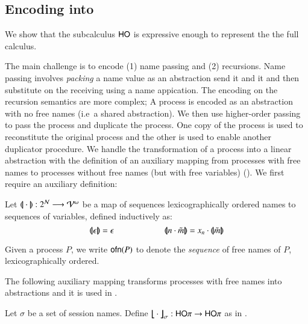 
\subsection{Encoding \HOp into \HO}
\label{subsec:HOp_to_HO}

We show that the subcalculus $\mathsf{HO}$ is expressive enough to
represent the the full \HOp calculus.

The main challenge is to encode (1) name passing 
and (2) recursions.
Name passing involves {\em packing} a name 
value as an abstraction send it and it and then
substitute on the receiving using a name appication.
The encoding on the recursion semantics are more complex;
A process is encoded as an abstraction with no free names
(i.e~a shared abstraction). We then use higher-order
passing to pass the process and duplicate the process.
One copy of the process is used to reconstitute the
original process and the other is used to enable another
duplicator procedure.
We handle the transformation of a process into a linear abstraction
with the definition of an
auxiliary mapping
from processes with free names to processes without free names
(but with free variables) (). 
We first require an auxiliary definition:
%
\begin{definition}\myrm 
	Let $(\!|\!|\cdot|\!|\!): 2^{\mathcal{N}} \longrightarrow \mathcal{V}^\omega$
	be a map of sequences lexicographically ordered 
	names to sequences of variables, defined
	inductively as:
%
	\[
		\vmap{\epsilon} = \epsilon \qquad \qquad \qquad \vmap{n \cat \tilde{m}} = x_n \cat \vmap{\tilde{m}}
	\]
\end{definition}

Given a process $P$, we write $\mathsf{ofn}(P)$ to denote the
\emph{sequence} of free names of $P$, lexicographically ordered.

The following auxiliary mapping transforms processes
with free names into abstractions and it is
used in .
%
\begin{definition}\myrm
	\label{def:auxmap}
	Let $\sigma$ be a set of session names.
	Define $\big\lfloor\!\!\big\lfloor\cdot\big\rfloor\!\!\big\rfloor_{\sigma}: \mathsf{HO}\pi \to \mathsf{HO}\pi$  as in .
\end{definition}

